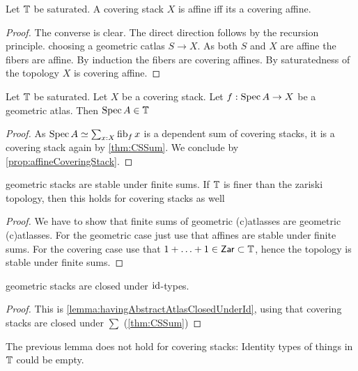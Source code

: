 \begin{prop}{\label{prop:affineCoveringStack}}
	Let $\mathbb{T}$ be saturated.
	A covering stack $X$ is affine iff its a covering affine.
\end{prop}
\begin{proof}
	The converse is clear. The direct direction follows by the recursion principle. choosing a geometric catlas  $S \to X$. As both $S$ and $X$ are affine the fibers are affine. By induction the fibers are covering affines. By saturatedness of the topology $X$ is covering affine.
\end{proof}
\begin{lemma}{\label{lemma:atlasIsCatlas}}
	Let $\mathbb{T}$ be saturated. Let $X$ be a covering stack. Let $f : \operatorname{Spec} A \to X$ be a geometric atlas. Then $\operatorname{Spec} A \in \mathbb{T}$
\end{lemma}
\begin{proof}
	As $\operatorname{Spec} A \simeq \sum_{x : X} \operatorname{fib}_f x$ is a dependent sum of covering stacks, it is a covering stack again by \ref{thm:CSSum}. We conclude by \ref{prop:affineCoveringStack}.
\end{proof}	
\begin{lemma}{\label{lemma:geomStackPlusStable}}
	geometric stacks are stable under finite sums.
	If $\mathbb{T}$ is finer than the zariski topology, then this holds for covering stacks as well
\end{lemma}
\begin{proof}
	We have to show that finite sums of geometric (c)atlasses are geometric (c)atlasses.
	For the geometric case just use that affines are stable under finite sums. For the covering case use that $1 + \hdots + 1 \in \mathsf{Zar} \subset \mathbb{T}$, hence the topology is stable under finite sums.
\end{proof}

\begin{lemma}{\label{lemma:geometricStacksClosedUnderId}}
	geometric stacks are closed under $\operatorname{id}$-types.
\end{lemma}
\begin{proof}
	
	This is \ref{lemma:havingAbstractAtlasClosedUnderId}, using that covering stacks are closed under $\sum$ (\ref{thm:CSSum})
\end{proof}

\begin{warning}
	The previous lemma does not hold for covering stacks: Identity types of things in $\mathbb{T}$ could be empty.
\end{warning}

